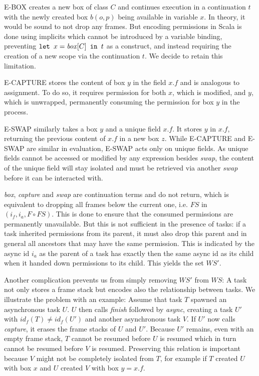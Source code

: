 E-BOX creates a new box of class $C$ and continues execution in a continuation $t$ with the newly created box $b(o,p)$ being available in variable $x$. In theory, it would be sound to not drop any frames. But encoding permissions in Scala is done using implicits which cannot be introduced by a variable binding, preventing $\texttt{let } x = \mathop{\mathit{box}}[C] \texttt{ in } t$ as a construct, and instead requiring the creation of a new scope via the continuation $t$. We decide to retain this limitation.

E-CAPTURE stores the content of box $y$ in the field $x.f$ and is analogous to assignment. To do so, it requires permission for both $x$, which is modified, and $y$, which is unwrapped, permanently consuming the permission for box $y$ in the process.

E-SWAP similarly takes a box $y$ and a unique field $x.f$. It stores $y$ in $x.f$, returning the previous content of $x.f$ in a new box $z$. While E-CAPTURE and E-SWAP are similar in evaluation, E-SWAP acts only on unique fields. As unique fields cannot be accessed or modified by any expression besides \textit{swap}, the content of the unique field will stay isolated and must be retrieved via another \textit{swap} before it can be interacted with.

\textit{box}, \textit{capture} and \textit{swap} are continuation terms and do not return, which is equivalent to dropping all frames below the current one, i.e. $FS$ in $(i_f, i_a, F \circ FS)$. This is done to ensure that the consumed permissions are permanently unavailable. But this is not sufficient in the presence of tasks: if a task inherited permissions from its parent, it must also drop this parent and in general all ancestors that may have the same permission. This is indicated by the async id $i_a$ as the parent of a task has exactly then the same async id as its child when it handed down permissions to its child. This yields the set $WS'$.

Another complication prevents us from simply removing $WS'$ from $WS$: A task not only stores a frame stack but encodes also the relationship between tasks. We illustrate the problem with an example: Assume that task $T$ spawned an asynchronous task $U$. $U$ then calls \textit{finish} followed by \textit{async}, creating a task $U'$ with $id_f(T) \neq id_f(U')$ and another asynchronous task $V$. If $U'$ now calls \textit{capture}, it erases the frame stacks of $U$ and $U'$. Because $U'$ remains, even with an empty frame stack, $T$ cannot be resumed before $U$ is resumed which in turn cannot be resumed before $V$ is resumed. Preserving this relation is important because $V$ might not be completely isolated from $T$, for example if $T$ created $U$ with box $x$ and $U$ created $V$ with box $y = x.f$.

